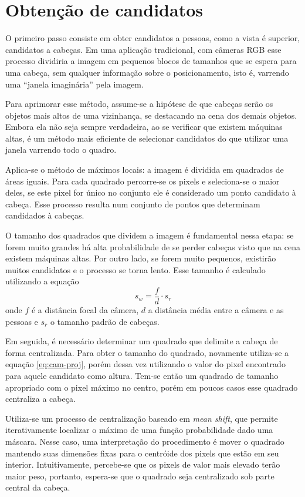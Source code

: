 \section{Obtenção de candidatos}
\label{sec:tradicional-candidatos}
O primeiro passo consiste em obter candidatos a pessoas, como a vista é superior, candidatos a cabeças. Em uma aplicação tradicional, com câmeras RGB esse processo dividiria a imagem em pequenos blocos de tamanhos que se espera para uma cabeça, sem qualquer informação sobre o posicionamento, isto é, varrendo uma ``janela imaginária'' pela imagem.

Para aprimorar esse método, assume-se a hipótese de que cabeças serão os objetos mais altos de uma vizinhança, se destacando na cena dos demais objetos. Embora ela não seja sempre verdadeira, ao se verificar que existem máquinas altas, é um método mais eficiente de selecionar candidatos do que utilizar uma janela varrendo todo o quadro.

Aplica-se o método de máximos locais: a imagem é dividida em quadrados de áreas iguais. Para cada quadrado percorre-se os pixels e seleciona-se o maior deles, se este pixel for único no conjunto ele é considerado um ponto candidato à cabeça. Esse processo resulta num conjunto de pontos que determinam candidados à cabeças.

O tamanho dos quadrados que dividem a imagem é fundamental nessa etapa: se forem muito grandes há alta probabilidade de se perder cabeças visto que na cena existem máquinas altas. Por outro lado, se forem muito pequenos, existirão muitos candidatos e o processo se torna lento. Esse tamanho é calculado \cite{rauter} utilizando a equação 
\begin{equation}
	\label{eq:cam-proj}
	s_w = \frac{f}{d} \cdot s_r
\end{equation}
 onde $f$ é a distância focal da câmera, $d$ a distância média entre a câmera e as pessoas e $s_r$ o tamanho padrão de cabeças.

Em seguida, é necessário determinar um quadrado que delimite a cabeça de forma centralizada. Para obter o tamanho do quadrado, novamente utiliza-se a equação \eqref{eq:cam-proj}, porém dessa vez utilizando o valor do pixel encontrado para aquele candidato como altura. Tem-se então um quadrado de tamanho apropriado com o pixel máximo no centro, porém em poucos casos esse quadrado centraliza a cabeça.

Utiliza-se um processo de centralização baseado em \textit{mean shift}, que permite iterativamente localizar o máximo de uma função probabilidade dado uma máscara. Nesse caso, uma interpretação do procedimento é mover o quadrado mantendo suas dimensões fixas para o centróide dos pixels que estão em seu interior. Intuitivamente, percebe-se que os pixels de valor mais elevado terão maior peso, portanto, espera-se que o quadrado seja centralizado sob parte central da cabeça.

